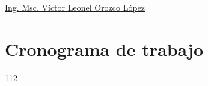 \documentclass[12pt,titlepage]{report}
\begin{document}
\href{http://vorozco.com/cv/index-es.html}{Ing.  Msc.  Víctor Leonel
  Orozco López}


\chapter{Cronograma de trabajo}
\begin {ganttchart}{1}{12}
\end {ganttchart}





{} 

\end{document}
